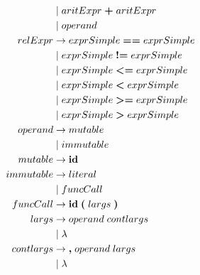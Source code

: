 \documentclass{article}
\begin{document}
\begin{align*}
			&\mid aritExpr \; \textbf{+} \; aritExpr \\
			&\mid operand \\
		relExpr &\rightarrow exprSimple \; \textbf{==} \; exprSimple \\
			&\mid exprSimple \; \textbf{!=} \; exprSimple \\
			&\mid exprSimple \; \textbf{\textless=} \; exprSimple \\
			&\mid exprSimple \; \textbf{\textless} \; exprSimple \\
			&\mid exprSimple \; \textbf{\textgreater=} \; exprSimple \\
			&\mid exprSimple \; \textbf{\textgreater} \; exprSimple \\
		operand &\rightarrow mutable \\
			&\mid immutable \\
		mutable &\rightarrow \textbf{id} \\
		immutable &\rightarrow literal \\
			&\mid funcCall \\
		funcCall &\rightarrow \textbf{id} \; \textbf{(} \; largs \; \textbf{)} \\
		largs &\rightarrow operand \; contlargs \\
			&\mid \lambda \\
		contlargs &\rightarrow \textbf{,} \; operand \; largs \\
			&\mid \lambda
\end{align*}
\end{document}
